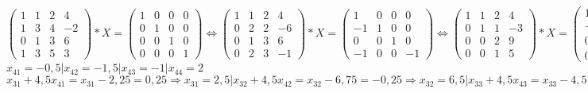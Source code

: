 \documentclass[12pt]{article}
\begin{document}
$\begin{pmatrix}
1 & 1 & 2 & 4 \\ 1 & 3 & 4 & -2 \\
0 & 1 & 3 & 6 \\ 1 & 3 & 5 & 3
\end{pmatrix}*X=\begin{pmatrix}
1 & 0 & 0 & 0 \\
0 & 1 & 0 & 0 \\
0 & 0 & 1 & 0 \\
0 & 0 & 0 & 1
\end{pmatrix}\Leftrightarrow\begin{pmatrix}
1 & 1 & 2 & 4 \\ 0 & 2 & 2 & -6 \\
0 & 1 & 3 & 6 \\ 0 & 2 & 3 & -1
\end{pmatrix}*X=\begin{pmatrix}
1 & 0 & 0 & 0 \\ -1 & 1 & 0 & 0 \\
0 & 0 & 1 & 0 \\ -1 & 0 & 0 & -1
\end{pmatrix} \Leftrightarrow \begin{pmatrix}
1 & 1 & 2 & 4 \\ 0 & 1 & 1 & -3 \\
0 & 0 & 2 & 9 \\ 0 & 0 & 1 & 5
\end{pmatrix}*X=\begin{pmatrix}
1 & 0 & 0 & 0 \\
-0,5 & 0,5 & 0 & 0 \\
0,5 & -0,5 & 1 & 0 \\
0 & -1 & 0 & 1
\end{pmatrix}\Leftrightarrow\begin{pmatrix}
1 & 1 & 2 & 4 \\ 0 & 1 & 1 & -3 \\
0 & 0 & 1 & 4,5 \\ 0 & 0 & 0 & 1
\end{pmatrix}*X=\begin{pmatrix}
1 & 0 & 0 & 0 \\ -0,5 & 0,5 & 0 & 0 \\
0,25 & -0,25 & 0,5 & 0 \\
-0,5 & -1,5 & -1 & 2 
\end{pmatrix}$\\
$x_{41}=-0,5 | x_{42}=-1,5 | x_{43}=-1 | x_{44}=2$\\
$x_{31}+4,5x_{41}=x_{31}-2,25=0,25 \Rightarrow x_{31}=2,5 | x_{32}+4,5x_{42}=x_{32}-6,75=-0,25 \Rightarrow x_{32}=6,5 | x_{33}+4,5x_{43}=x_{33}-4,5 = 0,5 \Rightarrow x_{33}=5 | x_{34}+4,5x_{44}=x_{34}+9 = 0 \Rightarrow x_{34}=-9$\\
\end{document}
